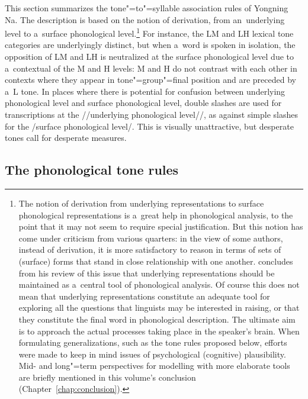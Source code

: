 This section summarizes the tone"=to"=syllable association rules of Yongning Na. The description is based on the notion of derivation, from an~underlying level to
a~surface phonological level.\footnote{The notion of derivation from underlying representations to surface phonological representations is a~great help in phonological analysis, to the point that it may not seem to require special justification. But this notion has come under criticism from various quarters: in the view of some authors, instead of derivation, it is more satisfactory to reason in terms of sets of (surface) forms that stand in close relationship with one another. \citet{hyman2015} concludes from his review of this issue that underlying representations should be maintained as a~central tool of phonological analysis. Of course this does not mean that underlying representations constitute an adequate tool for exploring all the questions that linguists may be interested in raising, or that they constitute the final word in phonological description. The ultimate aim is to approach the actual processes taking place in the speaker’s brain. When formulating generalizations, such as the tone rules proposed below, efforts were made to keep in mind issues of psychological (cognitive) plausibility. Mid- and long"=term perspectives for modelling with more elaborate tools are briefly mentioned in this volume's conclusion (Chapter~\ref{chap:conclusion}).} For instance, the LM and LH lexical tone categories are underlyingly
distinct, but when a~word is spoken in isolation, the opposition of LM and LH is neutralized at the
surface phonological level due to a~contextual  of the M and H levels: M and H do not contrast with each other in contexts
where they appear in tone"=group"=final position and are preceded by a~L tone. In places
where there is potential for confusion between underlying phonological level and surface
phonological level, double slashes are used for transcriptions at the //underlying phonological
level//, as against simple slashes for the /surface phonological level/. This is visually
unattractive, but desperate tones call for desperate measures.

 
\subsection{The phonological tone rules}
\label{sec:alistoftonerules}

